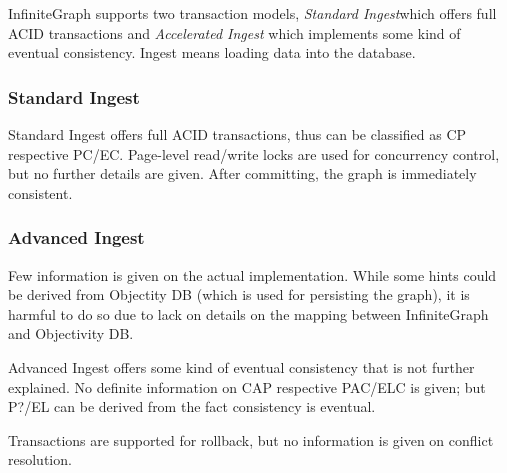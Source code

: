 
InfiniteGraph supports two transaction models,
\emph{Standard Ingest}which offers full ACID transactions and
\emph{Accelerated Ingest} which implements some kind of eventual consistency.
Ingest means loading data into the database.

\subsubsection{Standard Ingest}

Standard Ingest offers full ACID transactions, thus can be classified as CP respective PC/EC.
Page-level read/write locks are used for concurrency control, but no further details are given.
After committing, the graph is immediately consistent.

\subsubsection{Advanced Ingest}

Few information is given on the actual implementation.
While some hints could be derived from Objectity DB (which is used for persisting the graph),
it is harmful to do so due to lack on details on the mapping between InfiniteGraph and Objectivity DB.

Advanced Ingest offers some kind of eventual consistency that is not further explained.
No definite information on CAP respective PAC/ELC is given;
but P?/EL can be derived from the fact consistency is eventual.

Transactions are supported for rollback, but no information is given on conflict resolution.
